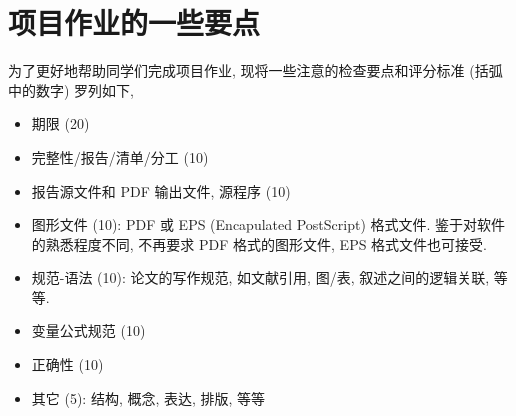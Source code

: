 \documentclass[10.5pt
]{article}
\begin{document}
\section*{项目作业的一些要点}
为了更好地帮助同学们完成项目作业, 现将一些注意的检查要点和评分标准 (括弧中的数字) 罗列如下,
\begin{itemize}
\item
期限 (20)
\item
完整性/报告/清单/分工 (10)
\item
报告源文件和 PDF 输出文件, 源程序 (10)
\item
图形文件 (10): PDF 或 EPS (Encapulated PostScript) 格式文件. 鉴于对软件的熟悉程度不同, 不再要求 PDF 格式的图形文件, EPS 格式文件也可接受.
\item
规范-语法 (10): 论文的写作规范, 如文献引用, 图/表, 叙述之间的逻辑关联, 等等.
\item
变量公式规范 (10)
\item
正确性 (10)
\item
其它 (5): 结构, 概念, 表达, 排版, 等等
\end{itemize}



\end{document}
